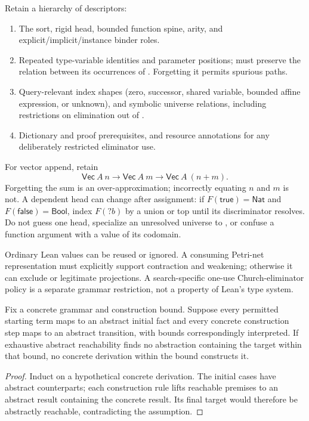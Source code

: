 Retain a hierarchy of descriptors:
\begin{enumerate}
\item The sort, rigid head, bounded function spine, arity, and explicit/implicit/instance binder roles.
\item Repeated type-variable identities and parameter positions;  must preserve the relation between its occurrences of . Forgetting it permits spurious  paths.
\item Query-relevant index shapes (zero, successor, shared variable, bounded affine expression, or unknown), and symbolic universe relations, including restrictions on elimination out of .
\item Dictionary and proof prerequisites, and resource annotations for any deliberately restricted eliminator use.
\end{enumerate}

For vector append, retain
\[
 \mathsf{Vec}\ A\ n\to\mathsf{Vec}\ A\ m\to\mathsf{Vec}\ A\ (n+m).
\]
Forgetting the sum is an over-approximation; incorrectly equating $n$ and $m$ is not. A dependent head can change after assignment: if $F(\mathsf{true})=\mathsf{Nat}$ and $F(\mathsf{false})=\mathsf{Bool}$, index $F(?b)$ by a union or top until its discriminator resolves. Do not guess one head, specialize an unresolved universe to , or confuse a function argument with a value of its codomain.

Ordinary Lean values can be reused or ignored. A consuming Petri-net representation must explicitly support contraction and weakening; otherwise it can exclude  or legitimate projections. A search-specific one-use Church-eliminator policy is a separate grammar restriction, not a property of Lean's type system.

\begin{proposition}\label{prop:retrieval-simulation}
Fix a concrete grammar and construction bound. Suppose every permitted starting term maps to an abstract initial fact and every concrete construction step maps to an abstract transition, with bounds correspondingly interpreted. If exhaustive abstract reachability finds no abstraction containing the target within that bound, no concrete derivation within the bound constructs it.
\end{proposition}
\begin{proof}
Induct on a hypothetical concrete derivation. The initial cases have abstract counterparts; each construction rule lifts reachable premises to an abstract result containing the concrete result. Its final target would therefore be abstractly reachable, contradicting the assumption.
\end{proof}

